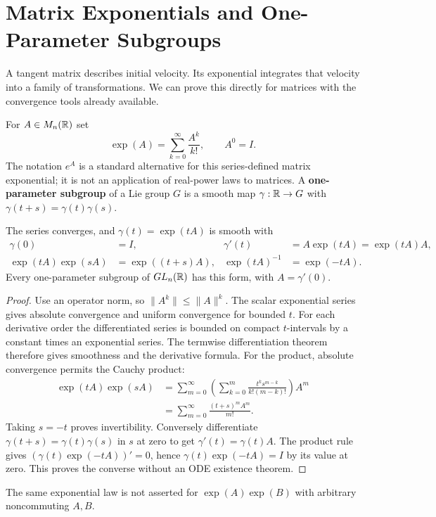 \section{Matrix Exponentials and One-Parameter Subgroups}
\label{sec:matrix-exponential}
A tangent matrix describes initial velocity. Its exponential integrates
that velocity into a family of transformations. We can prove this directly
for matrices with the convergence tools already available.
\begin{definition}
For $A\in M_n(\mathbb{R})$ set
\[
\exp(A)=\sum_{k=0}^{\infty}\frac{A^k}{k!},\qquad A^0=I.
\]
The notation $e^A$ is a standard alternative for this series-defined
matrix exponential; it is not an application of real-power laws to matrices.
A \textbf{one-parameter subgroup} of a Lie group $G$ is a smooth map
$\gamma:\mathbb{R}\to G$ with $\gamma(t+s)=\gamma(t)\gamma(s)$.
\end{definition}
\begin{proposition}
The series converges, and $\gamma(t)=\exp(tA)$ is smooth with
\[
\begin{aligned}
\gamma(0)&=I,& \gamma'(t)&=A\exp(tA)=\exp(tA)A,\\
\exp(tA)\exp(sA)&=\exp((t+s)A),&
\exp(tA)^{-1}&=\exp(-tA).
\end{aligned}
\]
Every one-parameter subgroup of $GL_n(\mathbb{R})$ has this form, with
$A=\gamma'(0)$.
\end{proposition}
\begin{proof}
Use an operator norm, so $\|A^k\|\leq\|A\|^k$. The scalar exponential
series gives absolute convergence and uniform convergence for bounded $t$.
For each derivative order the differentiated series is bounded on compact
$t$-intervals by a constant times an exponential series. The termwise
differentiation theorem therefore gives smoothness and the derivative
formula. For the product, absolute convergence permits the Cauchy product:
\[
\begin{aligned}
\exp(tA)\exp(sA)
&=\sum_{m=0}^{\infty}\left(\sum_{k=0}^m
\frac{t^ks^{m-k}}{k!(m-k)!}\right)A^m\\
&=\sum_{m=0}^{\infty}\frac{(t+s)^mA^m}{m!}.
\end{aligned}
\]
Taking $s=-t$ proves invertibility. Conversely differentiate
$\gamma(t+s)=\gamma(t)\gamma(s)$ in $s$ at zero to get
$\gamma'(t)=\gamma(t)A$. The product rule gives
$(\gamma(t)\exp(-tA))'=0$, hence $\gamma(t)\exp(-tA)=I$ by its value at zero.
This proves the converse without an ODE existence theorem.
\end{proof}
The same exponential law is not asserted for $\exp(A)\exp(B)$ with arbitrary
noncommuting $A,B$.

